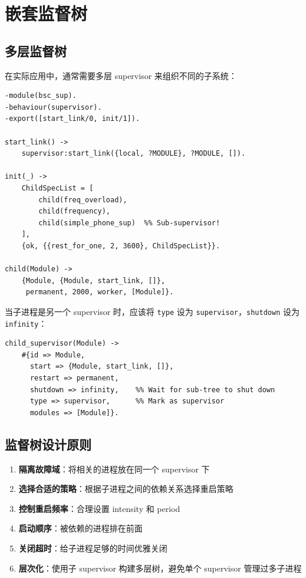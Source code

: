 \documentclass[a4paper,11pt]{article}
\begin{document}
\section{嵌套监督树}

\subsection{多层监督树}

在实际应用中，通常需要多层 supervisor 来组织不同的子系统：

\begin{lstlisting}[style=erlangstyle, caption={bsc\_sup.erl --- 顶层 supervisor}]
-module(bsc_sup).
-behaviour(supervisor).
-export([start_link/0, init/1]).

start_link() ->
    supervisor:start_link({local, ?MODULE}, ?MODULE, []).

init(_) ->
    ChildSpecList = [
        child(freq_overload),
        child(frequency),
        child(simple_phone_sup)  %% Sub-supervisor!
    ],
    {ok, {{rest_for_one, 2, 3600}, ChildSpecList}}.

child(Module) ->
    {Module, {Module, start_link, []},
     permanent, 2000, worker, [Module]}.
\end{lstlisting}

\begin{warnbox}
当子进程是另一个 supervisor 时，应该将 \texttt{type} 设为 \texttt{supervisor}，\texttt{shutdown} 设为 \texttt{infinity}：
\begin{lstlisting}[style=erlangstyle]
child_supervisor(Module) ->
    #{id => Module,
      start => {Module, start_link, []},
      restart => permanent,
      shutdown => infinity,    %% Wait for sub-tree to shut down
      type => supervisor,      %% Mark as supervisor
      modules => [Module]}.
\end{lstlisting}
\end{warnbox}

\subsection{监督树设计原则}

\begin{enumerate}[leftmargin=2em]
    \item \textbf{隔离故障域}：将相关的进程放在同一个 supervisor 下
    \item \textbf{选择合适的策略}：根据子进程之间的依赖关系选择重启策略
    \item \textbf{控制重启频率}：合理设置 intensity 和 period
    \item \textbf{启动顺序}：被依赖的进程排在前面
    \item \textbf{关闭超时}：给子进程足够的时间优雅关闭
    \item \textbf{层次化}：使用子 supervisor 构建多层树，避免单个 supervisor 管理过多子进程
\end{enumerate}
\end{document}
